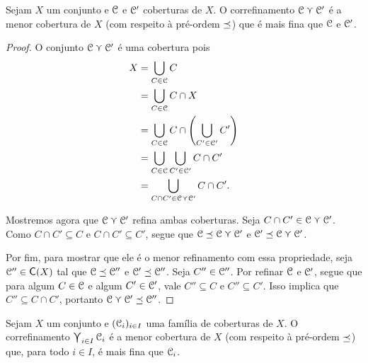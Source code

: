 \begin{proposition}
\label{prop:correfinamento.caracteristica.definidora}
Sejam $X$ um conjunto e $\mathcal{C}$ e $\mathcal{C}'$ coberturas de $X$. O correfinamento $\mathcal{C} \curlyvee \mathcal{C}'$ é a menor cobertura de $X$ (com respeito à pré-ordem $\preceq$) que é mais fina que $\mathcal{C}$ e $\mathcal{C}'$.
\end{proposition}
\begin{proof}
O conjunto $\mathcal{C} \curlyvee \mathcal{C}'$ é uma cobertura pois
	\begin{align*}
	X &= \bigcup_{C \in \mathcal{C}} C \\
		&= \bigcup_{C \in \mathcal{C}} C \cap X \\
		&= \bigcup_{C \in \mathcal{C}} C \cap \left( \bigcup_{C' \in \mathcal{C}'} C' \right) \\
		&= \bigcup_{C \in \mathcal{C}} \bigcup_{C' \in \mathcal{C}'} C \cap C' \\
		&=\bigcup_{C \cap C' \in \mathcal{C} \curlyvee \mathcal{C}'} C \cap C' .
	\end{align*}

Mostremos agora que $\mathcal{C} \curlyvee \mathcal{C}'$ refina ambas coberturas. Seja $C \cap C' \in \mathcal{C} \curlyvee \mathcal{C}'$. Como $C \cap C' \subseteq C$ e $C \cap C' \subseteq C'$, segue que $\mathcal{C} \preceq \mathcal{C} \curlyvee \mathcal{C}'$ e $\mathcal{C}' \preceq \mathcal{C} \curlyvee \mathcal{C}'$.

Por fim, para mostrar que ele é o menor refinamento com essa propriedade, seja $\cober'' \in \Cober(X)$ tal que $\mathcal{C} \preceq \mathcal{C}''$ e $\mathcal{C}' \preceq \mathcal{C}''$. Seja $C'' \in \mathcal{C}''$. Por refinar $\mathcal{C}$ e $\mathcal{C}'$, segue que para algum $C \in \mathcal{C}$ e algum $C' \in \mathcal{C}'$, vale $C'' \subseteq C$ e $C'' \subseteq C'$. Isso implica que $C'' \subseteq C \cap C'$, portanto $\mathcal{C} \curlyvee \mathcal{C}' \preceq \mathcal{C}''$.
\end{proof}

\begin{exercise}
Sejam $X$ um conjunto e $(\mathcal{C}_i)_{i \in I}$ uma família de coberturas de $X$. O correfinamento $\bigcurlyvee_{i \in I} \mathcal{C}_i$ é a menor cobertura de $X$ (com respeito à pré-ordem $\preceq$) que, para todo $i \in I$, é mais fina que $\mathcal{C}_i$.
\end{exercise}

